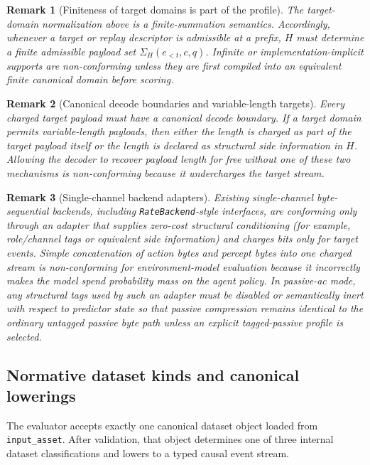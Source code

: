 \documentclass[11pt]{article}
\newtheorem{remark}{Remark}
\begin{document}
\begin{remark}[Finiteness of target domains is part of the profile]
The target-domain normalization above is a finite-summation semantics.
Accordingly, whenever a target or replay descriptor is admissible at a prefix,
$H$ must determine a finite admissible payload set
$\Sigma_H(e_{<t},c,q)$. Infinite or implementation-implicit supports are
non-conforming unless they are first compiled into an equivalent finite
canonical domain before scoring.
\end{remark}

\begin{remark}[Canonical decode boundaries and variable-length targets]
Every charged target payload must have a canonical decode boundary. If a target
domain permits variable-length payloads, then either the length is charged as
part of the target payload itself or the length is declared as structural side
information in $H$. Allowing the decoder to recover payload length for free
without one of these two mechanisms is non-conforming because it undercharges
the target stream.
\end{remark}

\begin{remark}[Single-channel backend adapters]
Existing single-channel byte-sequential backends, including
\texttt{RateBackend}-style interfaces, are conforming only through an adapter
that supplies zero-cost structural conditioning (for example, role/channel tags
or equivalent side information) and charges bits only for target events.
Simple concatenation of action bytes and percept bytes into one charged stream
is non-conforming for environment-model evaluation because it incorrectly makes
the model spend probability mass on the agent policy.
In passive-ac mode, any structural tags used by such an adapter must be
disabled or semantically inert with respect to predictor state so that passive
compression remains identical to the ordinary untagged passive byte path unless
an explicit tagged-passive profile is selected.
\end{remark}

\subsection{Normative dataset kinds and canonical lowerings}

The evaluator accepts exactly one canonical dataset object loaded from
\texttt{input\_asset}. After validation, that object determines one of three
internal dataset classifications and lowers to a typed causal event stream.
\end{document}
